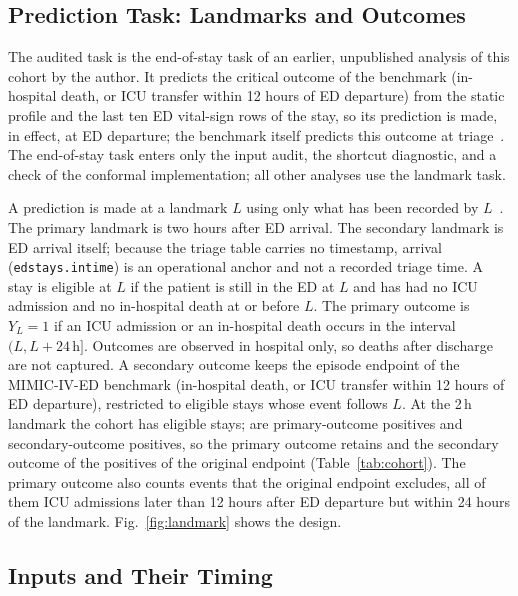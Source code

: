\subsection{Prediction Task: Landmarks and Outcomes}
\label{sec:methods-task}

The audited task is the end-of-stay task of an earlier, unpublished analysis of this cohort by the author. It predicts the critical outcome of the benchmark (in-hospital death, or ICU transfer within 12 hours of ED departure) from the static profile and the last ten ED vital-sign rows of the stay, so its prediction is made, in effect, at ED departure; the benchmark itself predicts this outcome at triage~\cite{xie2022mimic4ed}. The end-of-stay task enters only the input audit, the shortcut diagnostic, and a check of the conformal implementation; all other analyses use the landmark task.

A prediction is made at a landmark $L$ using only what has been recorded by $L$~\cite{vanhouwelingen2007landmarking}. The primary landmark is two
hours after ED arrival. The secondary landmark is ED arrival itself; because the triage table carries no timestamp, arrival
(\texttt{edstays.intime}) is an operational anchor and not a recorded triage time. A stay is eligible at $L$ if the patient is still in the ED
at $L$ and has had no ICU admission and no in-hospital death at or before $L$. The primary outcome is
$Y_L = 1$ if an ICU admission or an in-hospital death occurs in the interval $(L, L + 24\,\mathrm{h}]$. Outcomes are observed in hospital
only, so deaths after discharge are not captured. A secondary outcome keeps the episode endpoint of the MIMIC-IV-ED benchmark
(in-hospital death, or ICU transfer within 12 hours of ED departure), restricted to eligible stays whose event follows $L$. At the 2\,h landmark the
cohort has \RVHtwoEligibleTotal{} eligible stays; \RVHtwoPrimaryPositivesTotal{} are primary-outcome positives and \RVHtwoSecondaryPositivesTotal{}
secondary-outcome positives, so the primary outcome retains \RVRetainedPrimary{} and the secondary outcome \RVRetainedSecondary{} of the \RVOriginalPositivesTotal{} positives of the original endpoint (Table~\ref{tab:cohort}). The primary outcome also counts \RVOverlapPrimaryOnly{} events that the original endpoint excludes, all of them ICU admissions later than 12 hours after ED departure but within 24 hours of the landmark. Fig.~\ref{fig:landmark} shows the design.




\subsection{Inputs and Their Timing}
\label{sec:methods-inputs}

